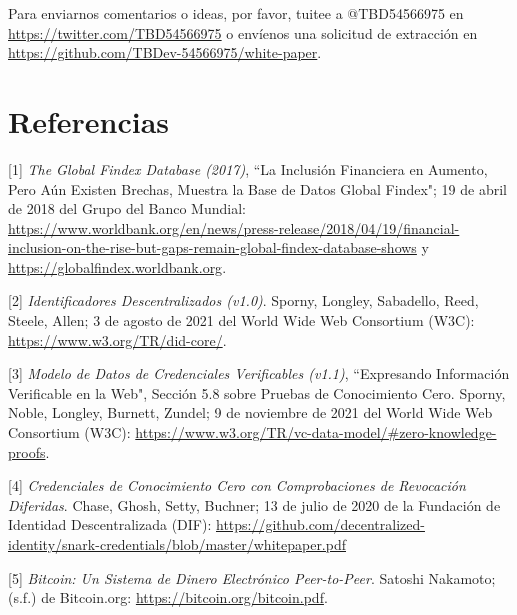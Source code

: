 \documentclass[11pt]{article}
\begin{document}
\vspace{1\baselineskip}
Para enviarnos comentarios o ideas, por favor, tuitee a @TBD54566975 en \url{https://twitter.com/TBD54566975} o envíenos una solicitud de extracción en \url{https://github.com/TBDev-54566975/white-paper}{\Large .}

\vspace{1\baselineskip}
\section{Referencias}

[1] \textit{The Global Findex Database (2017)}, ``La Inclusión Financiera en Aumento, Pero Aún Existen Brechas, Muestra la Base de Datos Global Findex"; 19 de abril de 2018 del Grupo del Banco Mundial: \url{https://www.worldbank.org/en/news/press-release/2018/04/19/financial-inclusion-on-the-rise-but-gaps-remain-global-findex-database-shows} y \url{https://globalfindex.worldbank.org}.

\vspace{1\baselineskip}
[2] \textit{Identificadores Descentralizados (v1.0)}. Sporny, Longley, Sabadello, Reed, Steele, Allen; 3 de agosto de 2021 del World Wide Web Consortium (W3C): \url{https://www.w3.org/TR/did-core/}.

\vspace{1\baselineskip}
[3] \textit{Modelo de Datos de Credenciales Verificables (v1.1)}, ``Expresando Información Verificable en la Web", Sección 5.8 sobre Pruebas de Conocimiento Cero. Sporny, Noble, Longley, Burnett, Zundel; 9 de noviembre de 2021 del World Wide Web Consortium (W3C): \url{https://www.w3.org/TR/vc-data-model/#zero-knowledge-proofs}. \ \ 

\vspace{1\baselineskip}
[4] \textit{Credenciales de Conocimiento Cero con Comprobaciones de Revocación Diferidas}. Chase, Ghosh, Setty, Buchner; 13 de julio de 2020 de la Fundación de Identidad Descentralizada (DIF): \url{https://github.com/decentralized-identity/snark-credentials/blob/master/whitepaper.pdf}

\vspace{1\baselineskip}
[5] \textit{Bitcoin: Un Sistema de Dinero Electrónico Peer-to-Peer}. Satoshi Nakamoto; (s.f.) de Bitcoin.org: \url{https://bitcoin.org/bitcoin.pdf}.
\end{document}
